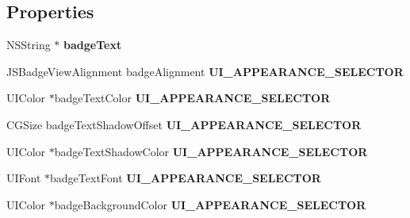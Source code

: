 \subsection*{Properties}
\begin{DoxyCompactItemize}
\item 
\hypertarget{interface_j_s_badge_view_abb78c631f76b3ac2ffccd8a77c1e19b4}{}N\+S\+String $\ast$ {\bfseries badge\+Text}\label{interface_j_s_badge_view_abb78c631f76b3ac2ffccd8a77c1e19b4}

\item 
\hypertarget{interface_j_s_badge_view_a405de83772c01aee555ad7d6c3570f79}{}J\+S\+Badge\+View\+Alignment badge\+Alignment {\bfseries U\+I\+\_\+\+A\+P\+P\+E\+A\+R\+A\+N\+C\+E\+\_\+\+S\+E\+L\+E\+C\+T\+O\+R}\label{interface_j_s_badge_view_a405de83772c01aee555ad7d6c3570f79}

\item 
\hypertarget{interface_j_s_badge_view_a232fa075111ca85d931288553c71b916}{}U\+I\+Color $\ast$badge\+Text\+Color {\bfseries U\+I\+\_\+\+A\+P\+P\+E\+A\+R\+A\+N\+C\+E\+\_\+\+S\+E\+L\+E\+C\+T\+O\+R}\label{interface_j_s_badge_view_a232fa075111ca85d931288553c71b916}

\item 
\hypertarget{interface_j_s_badge_view_a31fbeb2efb81fca780ca0b7b306089d4}{}C\+G\+Size badge\+Text\+Shadow\+Offset {\bfseries U\+I\+\_\+\+A\+P\+P\+E\+A\+R\+A\+N\+C\+E\+\_\+\+S\+E\+L\+E\+C\+T\+O\+R}\label{interface_j_s_badge_view_a31fbeb2efb81fca780ca0b7b306089d4}

\item 
\hypertarget{interface_j_s_badge_view_abca71f67b71fd325afa6769d0f1990d4}{}U\+I\+Color $\ast$badge\+Text\+Shadow\+Color {\bfseries U\+I\+\_\+\+A\+P\+P\+E\+A\+R\+A\+N\+C\+E\+\_\+\+S\+E\+L\+E\+C\+T\+O\+R}\label{interface_j_s_badge_view_abca71f67b71fd325afa6769d0f1990d4}

\item 
\hypertarget{interface_j_s_badge_view_ae8800eafd648f253aab826fdb2c442d2}{}U\+I\+Font $\ast$badge\+Text\+Font {\bfseries U\+I\+\_\+\+A\+P\+P\+E\+A\+R\+A\+N\+C\+E\+\_\+\+S\+E\+L\+E\+C\+T\+O\+R}\label{interface_j_s_badge_view_ae8800eafd648f253aab826fdb2c442d2}

\item 
\hypertarget{interface_j_s_badge_view_afd8447fd8ec5d056984a91316cbbddf3}{}U\+I\+Color $\ast$badge\+Background\+Color {\bfseries U\+I\+\_\+\+A\+P\+P\+E\+A\+R\+A\+N\+C\+E\+\_\+\+S\+E\+L\+E\+C\+T\+O\+R}\label{interface_j_s_badge_view_afd8447fd8ec5d056984a91316cbbddf3}


\end{DoxyCompactItemize}
